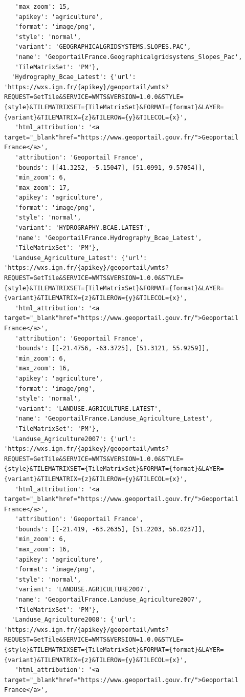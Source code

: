 \documentclass[
  letterpaper,
  DIV=11,
  numbers=noendperiod]{scrreprt}
\begin{document}
\begin{verbatim}
   'max_zoom': 15,
   'apikey': 'agriculture',
   'format': 'image/png',
   'style': 'normal',
   'variant': 'GEOGRAPHICALGRIDSYSTEMS.SLOPES.PAC',
   'name': 'GeoportailFrance.Geographicalgridsystems_Slopes_Pac',
   'TileMatrixSet': 'PM'},
  'Hydrography_Bcae_Latest': {'url': 'https://wxs.ign.fr/{apikey}/geoportail/wmts?REQUEST=GetTile&SERVICE=WMTS&VERSION=1.0.0&STYLE={style}&TILEMATRIXSET={TileMatrixSet}&FORMAT={format}&LAYER={variant}&TILEMATRIX={z}&TILEROW={y}&TILECOL={x}',
   'html_attribution': '<a target="_blank"href="https://www.geoportail.gouv.fr/">Geoportail France</a>',
   'attribution': 'Geoportail France',
   'bounds': [[41.3252, -5.15047], [51.0991, 9.57054]],
   'min_zoom': 6,
   'max_zoom': 17,
   'apikey': 'agriculture',
   'format': 'image/png',
   'style': 'normal',
   'variant': 'HYDROGRAPHY.BCAE.LATEST',
   'name': 'GeoportailFrance.Hydrography_Bcae_Latest',
   'TileMatrixSet': 'PM'},
  'Landuse_Agriculture_Latest': {'url': 'https://wxs.ign.fr/{apikey}/geoportail/wmts?REQUEST=GetTile&SERVICE=WMTS&VERSION=1.0.0&STYLE={style}&TILEMATRIXSET={TileMatrixSet}&FORMAT={format}&LAYER={variant}&TILEMATRIX={z}&TILEROW={y}&TILECOL={x}',
   'html_attribution': '<a target="_blank"href="https://www.geoportail.gouv.fr/">Geoportail France</a>',
   'attribution': 'Geoportail France',
   'bounds': [[-21.4756, -63.3725], [51.3121, 55.9259]],
   'min_zoom': 6,
   'max_zoom': 16,
   'apikey': 'agriculture',
   'format': 'image/png',
   'style': 'normal',
   'variant': 'LANDUSE.AGRICULTURE.LATEST',
   'name': 'GeoportailFrance.Landuse_Agriculture_Latest',
   'TileMatrixSet': 'PM'},
  'Landuse_Agriculture2007': {'url': 'https://wxs.ign.fr/{apikey}/geoportail/wmts?REQUEST=GetTile&SERVICE=WMTS&VERSION=1.0.0&STYLE={style}&TILEMATRIXSET={TileMatrixSet}&FORMAT={format}&LAYER={variant}&TILEMATRIX={z}&TILEROW={y}&TILECOL={x}',
   'html_attribution': '<a target="_blank"href="https://www.geoportail.gouv.fr/">Geoportail France</a>',
   'attribution': 'Geoportail France',
   'bounds': [[-21.419, -63.2635], [51.2203, 56.0237]],
   'min_zoom': 6,
   'max_zoom': 16,
   'apikey': 'agriculture',
   'format': 'image/png',
   'style': 'normal',
   'variant': 'LANDUSE.AGRICULTURE2007',
   'name': 'GeoportailFrance.Landuse_Agriculture2007',
   'TileMatrixSet': 'PM'},
  'Landuse_Agriculture2008': {'url': 'https://wxs.ign.fr/{apikey}/geoportail/wmts?REQUEST=GetTile&SERVICE=WMTS&VERSION=1.0.0&STYLE={style}&TILEMATRIXSET={TileMatrixSet}&FORMAT={format}&LAYER={variant}&TILEMATRIX={z}&TILEROW={y}&TILECOL={x}',
   'html_attribution': '<a target="_blank"href="https://www.geoportail.gouv.fr/">Geoportail France</a>',

\end{verbatim}
\end{document}
